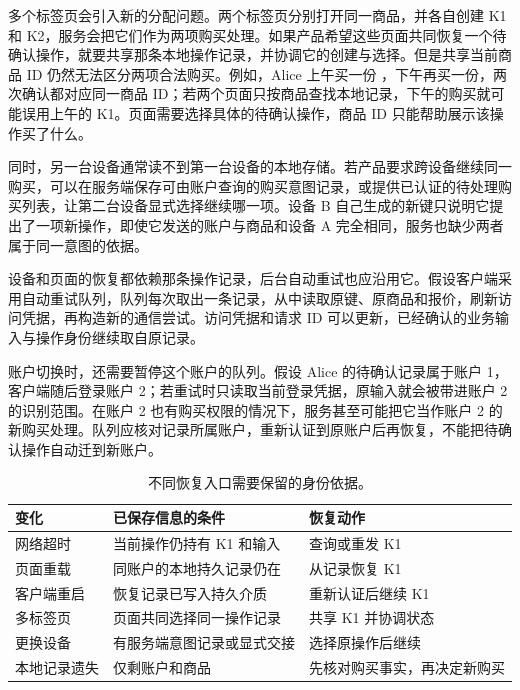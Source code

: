 多个标签页会引入新的分配问题。两个标签页分别打开同一商品，并各自创建 K1 和 K2，服务会把它们作为两项购买处理。如果产品希望这些页面共同恢复一个待确认操作，就要共享那条本地操作记录，并协调它的创建与选择。但是共享当前商品 ID 仍然无法区分两项合法购买。例如，Alice 上午买一份 ，下午再买一份，两次确认都对应同一商品 ID；若两个页面只按商品查找本地记录，下午的购买就可能误用上午的 K1。页面需要选择具体的待确认操作，商品 ID 只能帮助展示该操作买了什么。

同时，另一台设备通常读不到第一台设备的本地存储。若产品要求跨设备继续同一购买，可以在服务端保存可由账户查询的购买意图记录，或提供已认证的待处理购买列表，让第二台设备显式选择继续哪一项。设备 B 自己生成的新键只说明它提出了一项新操作，即使它发送的账户与商品和设备 A 完全相同，服务也缺少两者属于同一意图的依据。

设备和页面的恢复都依赖那条操作记录，后台自动重试也应沿用它。假设客户端采用自动重试队列，队列每次取出一条记录，从中读取原键、原商品和报价，刷新访问凭据，再构造新的通信尝试。访问凭据和请求 ID 可以更新，已经确认的业务输入与操作身份继续取自原记录。

账户切换时，还需要暂停这个账户的队列。假设 Alice 的待确认记录属于账户 1，客户端随后登录账户 2；若重试时只读取当前登录凭据，原输入就会被带进账户 2 的识别范围。在账户 2 也有购买权限的情况下，服务甚至可能把它当作账户 2 的新购买处理。队列应核对记录所属账户，重新认证到原账户后再恢复，不能把待确认操作自动迁到新账户。



\begin{table}[htbp]
\centering\small
\begin{tabularx}{\linewidth}{@{}p{2.5cm}XX@{}}
\toprule
变化 & 已保存信息的条件 & 恢复动作\\
\midrule
网络超时 & 当前操作仍持有 K1 和输入 & 查询或重发 K1\\
页面重载 & 同账户的本地持久记录仍在 & 从记录恢复 K1\\
客户端重启 & 恢复记录已写入持久介质 & 重新认证后继续 K1\\
多标签页 & 页面共同选择同一操作记录 & 共享 K1 并协调状态\\
更换设备 & 有服务端意图记录或显式交接 & 选择原操作后继续\\
本地记录遗失 & 仅剩账户和商品 & 先核对购买事实，再决定新购买\\
\bottomrule
\end{tabularx}
\caption{不同恢复入口需要保留的身份依据。}
\end{table}

